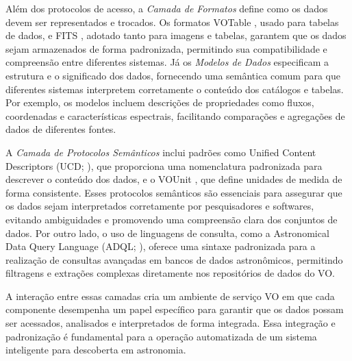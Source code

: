 Além dos protocolos de acesso, a \emph{Camada de Formatos} define como os dados devem ser representados e trocados. Os formatos VOTable \citep{votable}, usado para tabelas de dados, e FITS \citep{fits}, adotado tanto para imagens e tabelas, garantem que os dados sejam armazenados de forma padronizada, permitindo sua compatibilidade e compreensão entre diferentes sistemas. Já os \emph{Modelos de Dados} \citep{vomodel} especificam a estrutura e o significado dos dados, fornecendo uma semântica comum para que diferentes sistemas interpretem corretamente o conteúdo dos catálogos e tabelas. Por exemplo, os modelos incluem descrições de propriedades como fluxos, coordenadas e características espectrais, facilitando comparações e agregações de dados de diferentes fontes.

A \emph{Camada de Protocolos Semânticos} inclui padrões como Unified Content Descriptors (UCD; \citealp{ucd}), que proporciona uma nomenclatura padronizada para descrever o conteúdo dos dados, e o VOUnit \citep{vounit}, que define unidades de medida de forma consistente. Esses protocolos semânticos são essenciais para assegurar que os dados sejam interpretados corretamente por pesquisadores e softwares, evitando ambiguidades e promovendo uma compreensão clara dos conjuntos de dados. Por outro lado, o uso de linguagens de consulta, como a Astronomical Data Query Language (ADQL; \citealp{adql}), oferece uma sintaxe padronizada para a realização de consultas avançadas em bancos de dados astronômicos, permitindo filtragens e extrações complexas diretamente nos repositórios de dados do VO.

A interação entre essas camadas cria um ambiente de serviço VO em que cada componente desempenha um papel específico para garantir que os dados possam ser acessados, analisados e interpretados de forma integrada. Essa integração e padronização é fundamental para a operação automatizada de um sistema inteligente para descoberta em astronomia. %




